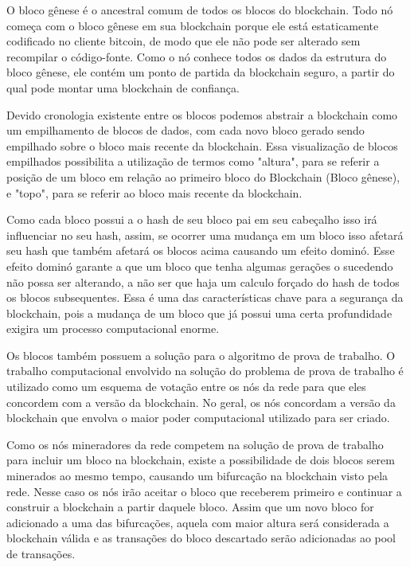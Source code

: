 \documentclass[conference,compsoc]{IEEEtran}
\begin{document}
O bloco gênese é o ancestral comum de todos os blocos do blockchain. Todo nó começa com o bloco gênese em sua blockchain porque ele está estaticamente codificado no cliente bitcoin, de modo que ele não pode ser alterado sem recompilar o código-fonte. Como o nó conhece todos os dados da estrutura do bloco gênese, ele contém um ponto de partida da blockchain seguro, a partir do qual pode montar uma blockchain de confiança. 

Devido cronologia existente entre os blocos podemos abstrair a blockchain como um empilhamento de blocos de dados, com cada  novo bloco gerado sendo empilhado sobre o bloco mais recente da blockchain. Essa visualização de blocos empilhados possibilita a utilização de termos como "altura", para se referir a posição de um bloco em relação ao primeiro bloco do Blockchain (Bloco gênese), e "topo", para se referir ao bloco mais recente da blockchain. 

Como cada bloco possui a o hash de seu bloco pai em seu cabeçalho isso irá influenciar no seu hash, assim, se ocorrer uma mudança em um bloco isso afetará seu hash que também afetará os blocos acima causando um efeito dominó. Esse efeito dominó garante a  que um bloco que tenha algumas gerações o sucedendo não possa ser alterando, a não ser que haja um calculo forçado do hash de todos os blocos subsequentes. Essa é uma das características chave para a segurança da blockchain, pois a mudança de um bloco que já possui uma certa profundidade exigira um processo computacional enorme.

Os blocos também possuem a solução para o algoritmo de prova de trabalho. O trabalho computacional envolvido na solução do problema de prova de trabalho é utilizado como um esquema de votação entre os nós da rede para que eles concordem com a versão da blockchain. No geral, os nós concordam a versão da blockchain que envolva o maior poder computacional utilizado para ser criado.

Como os nós mineradores da rede competem na solução de prova de trabalho para incluir um bloco na blockchain, existe a possibilidade de dois blocos serem minerados ao mesmo tempo, causando um bifurcação na blockchain visto pela rede. Nesse caso os nós irão aceitar o bloco que receberem primeiro e continuar a construir a blockchain a partir daquele bloco. Assim que um novo bloco for adicionado a uma das bifurcações, aquela com maior altura será considerada a blockchain válida e as transações do bloco descartado serão adicionadas ao pool de transações.
\end{document}
